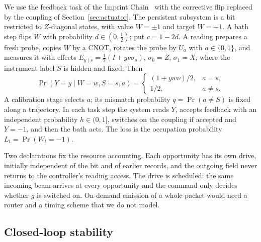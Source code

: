 \documentclass[aps,pre,onecolumn,superscriptaddress,floatfix,longbibliography]{revtex4-2}
\begin{document}
We use the feedback task of the Imprint Chain~\cite{Liu2026Chain} with the corrective flip replaced by the coupling of Section~\ref{sec:actuator}. The persistent subsystem is a bit restricted to $Z$-diagonal states, with value $W=\pm1$ and target $W=+1$. A bath step flips $W$ with probability $d\in(0,\tfrac12)$; put $c=1-2d$. A reading prepares a fresh probe, copies $W$ by a CNOT, rotates the probe by $U_a$ with $a\in\{0,1\}$, and measures it with effects $E_{y\mid s}=\tfrac12(I+y\nu\sigma_s)$, $\sigma_0=Z$, $\sigma_1=X$, where the instrument label $S$ is hidden and fixed. Then
\begin{equation}
\Pr(Y=y\mid W=w,S=s,a)=\begin{cases}(1+yw\nu)/2,&a=s,\\ 1/2,&a\ne s.\end{cases}
\end{equation}
A calibration stage selects $a$; its mismatch probability $q=\Pr(a\ne S)$ is fixed along a trajectory. In each task step the system reads $Y$, accepts feedback with an independent probability $h\in(0,1]$, switches on the coupling if accepted and $Y=-1$, and then the bath acts. The loss is the occupation probability $L_t=\Pr(W_t=-1)$.

Two declarations fix the resource accounting. Each opportunity has its own drive, initially independent of the bit and of earlier records, and the outgoing field never returns to the controller's reading access. The drive is scheduled: the same incoming beam arrives at every opportunity and the command only decides whether $g$ is switched on. On-demand emission of a whole packet would need a router and a timing scheme that we do not model.

\subsection{Closed-loop stability}
\end{document}

